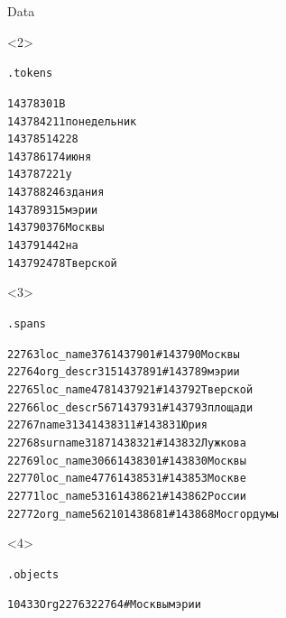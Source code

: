 \documentclass[10pt, compress]{beamer}
\begin{document}
\begin{frame}{Data}
\begin{onlyenv}
\end{onlyenv}
\begin{onlyenv}<2>
\begin{center}
\texttt{.tokens}
\end{center}
{\small 
\begin{alltt}
143783 0 1 В \\
143784 2 11 понедельник \\
143785 14 2 28 \\
143786 17 4 июня \\
143787 22 1 у \\
143788 24 6 здания \\
143789 31 5 мэрии \\
143790 37 6 Москвы \\
143791 44 2 на \\
143792 47 8 Тверской \\
\end{alltt}
}
\end{onlyenv}
\begin{onlyenv}<3>
\begin{center}
\texttt{.spans}
\end{center}
{\small 
\begin{alltt}
22763 loc\_name 37 6 143790 1  \# 143790 Москвы \\
22764 org\_descr 31 5 143789 1  \# 143789 мэрии \\
22765 loc\_name 47 8 143792 1  \# 143792 Тверской \\
22766 loc\_descr 56 7 143793 1  \# 143793 площади \\
22767 name 313 4 143831 1  \# 143831 Юрия \\
22768 surname 318 7 143832 1  \# 143832 Лужкова \\
22769 loc\_name 306 6 143830 1  \# 143830 Москвы \\
22770 loc\_name 477 6 143853 1  \# 143853 Москве \\
22771 loc\_name 531 6 143862 1  \# 143862 России \\
22772 org\_name 562 10 143868 1  \# 143868 Мосгордумы \\
\end{alltt}
}
\end{onlyenv}
\begin{onlyenv}<4>
\begin{center}
\texttt{.objects}
\end{center}
{\small 
\begin{alltt}
10433 Org 22763 22764 \# Москвы мэрии \\

\end{alltt}}
\end{onlyenv}
\end{frame}
\end{document}
